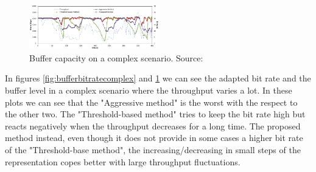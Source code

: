 \documentclass[openany]{book}
\begin{document}
\begin{figure}[ht!]
	\centering
	\includegraphics[width=0.5\textwidth]{buffer_buffer_normal}
    \caption{Buffer capacity on a complex scenario. Source: \cite{buffer}}\label{fig:buffercapacitycomplex}
\end{figure}

In figures \ref{fig:bufferbitratecomplex} and \ref{fig:buffercapacitycomplex} we can see the adapted bit rate and the buffer level in a complex scenario where the throughput varies a lot. In these plots we can see that the "Aggressive method" is the worst with the respect to the other two. The "Threshold-based method" tries to keep the bit rate high but reacts negatively when the throughput decreases for a long time. The proposed method instead, even though it does not provide in some cases a higher bit rate of the "Threshold-base method", the increasing/decreasing in small steps of the representation copes better with large throughput fluctuations.  


\end{document}
